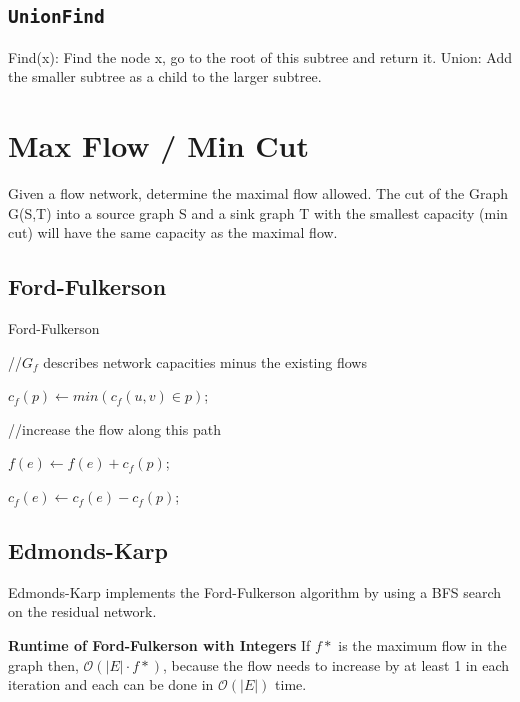 \documentclass[9pt,landscape,a4paper, table]{extarticle}
\begin{document}
\begin{multicols*}{3}
\subsection{\texttt{UnionFind}}
Find(x): Find the node x, go to the root of this subtree and return it.
Union: Add the smaller subtree as a child to the larger subtree.

\section{Max Flow / Min Cut}
Given a flow network, determine the maximal flow allowed.
The cut of the Graph G(S,T) into a source graph S and a sink graph T with the smallest capacity (min cut) will have the same capacity as the maximal flow.

\subsection{Ford-Fulkerson}

{\scriptsize
\begin{algorithm}[H]
    \caption{Ford-Fulkerson}
    
    \SetAlgoLined
    
    //$G_f$ describes network capacities minus the existing flows
    
    {
        $c_f(p) \leftarrow min( c_f(u,v)  \in p )$;
        
        //increase the flow along this path
        
         {
            $f(e) \leftarrow f(e) + c_f(p)$;
            
            $c_f(e) \leftarrow c_f(e) - c_f(p)$;
            
        }
    }
\end{algorithm}}

\subsection{Edmonds-Karp}
Edmonds-Karp implements the Ford-Fulkerson algorithm by using a BFS search on the residual network.

\textbf{Runtime of Ford-Fulkerson with Integers}
If $f*$ is the maximum flow in the graph then,
$\mathcal{O}(|E| \cdot f*)$, because the flow needs to increase by at least 1 in each iteration and each can be done in $\mathcal{O}(|E|)$ time. 


\end{multicols*}
\end{document}
